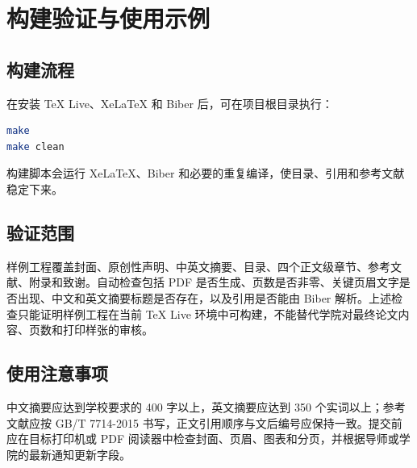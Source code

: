 \chapter{构建验证与使用示例}

\section{构建流程}
在安装 TeX Live、XeLaTeX 和 Biber 后，可在项目根目录执行：
\begin{lstlisting}[language=bash,caption={本地构建命令}]
make
make clean
\end{lstlisting}
构建脚本会运行 XeLaTeX、Biber 和必要的重复编译，使目录、引用和参考文献稳定下来。

\section{验证范围}
样例工程覆盖封面、原创性声明、中英文摘要、目录、四个正文级章节、参考文献、附录和致谢。自动检查包括 PDF 是否生成、页数是否非零、关键页眉文字是否出现、中文和英文摘要标题是否存在，以及引用是否能由 Biber 解析。上述检查只能证明样例工程在当前 TeX Live 环境中可构建，不能替代学院对最终论文内容、页数和打印样张的审核。

\section{使用注意事项}
中文摘要应达到学校要求的 400 字以上，英文摘要应达到 350 个实词以上；参考文献应按 GB/T 7714-2015 书写，正文引用顺序与文后编号应保持一致。提交前应在目标打印机或 PDF 阅读器中检查封面、页眉、图表和分页，并根据导师或学院的最新通知更新字段。
